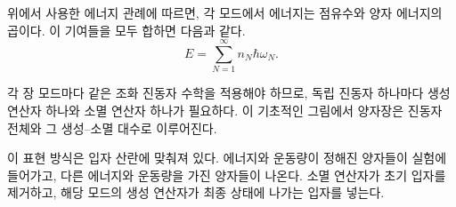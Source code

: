 위에서 사용한 에너지 관례에 따르면, 각 모드에서 에너지는 점유수와 양자 에너지의 곱이다. 이 기여들을 모두 합하면 다음과 같다.
\begin{equation}
E=\sum_{N=1}^{\infty} n_N\hbar\omega_N.
\end{equation}

각 장 모드마다 같은 조화 진동자 수학을 적용해야 하므로, 독립 진동자 하나마다 생성 연산자 하나와 소멸 연산자 하나가 필요하다. 이 기초적인 그림에서 양자장은 진동자 전체와 그 생성--소멸 대수로 이루어진다.

이 표현 방식은 입자 산란에 맞춰져 있다. 에너지와 운동량이 정해진 양자들이 실험에 들어가고, 다른 에너지와 운동량을 가진 양자들이 나온다. 소멸 연산자가 초기 입자를 제거하고, 해당 모드의 생성 연산자가 최종 상태에 나가는 입자를 넣는다.

\begin{classroomqa}\end{classroomqa}
